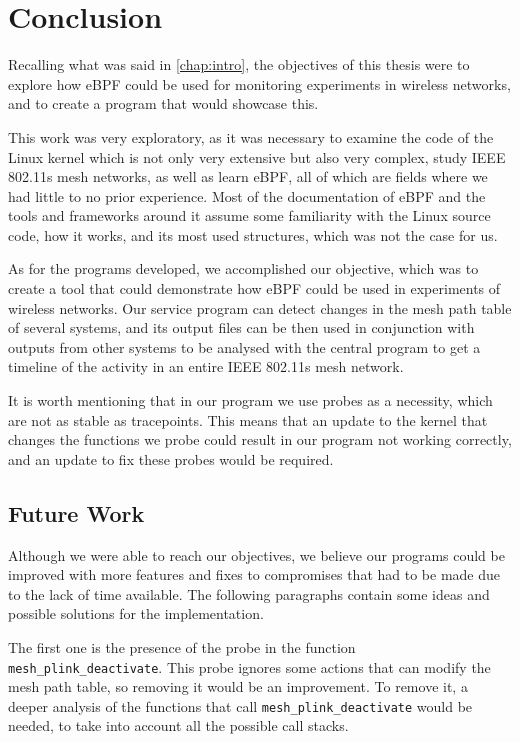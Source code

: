 \chapter{Conclusion}\label{chap:conc}

Recalling what was said in \autoref{chap:intro}, the objectives of this thesis
were to explore how eBPF could be used for monitoring experiments in wireless
networks, and to create a program that would showcase this.

This work was very exploratory, as it was necessary to examine the code of the
Linux kernel which is not only very extensive but also very complex, study
\ac{IEEE} 802.11s mesh networks, as well as learn eBPF, all of which are fields
where we had little to no prior experience. Most of the documentation of eBPF
and the tools and frameworks around it assume some familiarity with the Linux
source code, how it works, and its most used structures, which was not the case
for us.

As for the programs developed, we accomplished our objective, which was to
create a tool that could demonstrate how eBPF could be used in experiments of
wireless networks. Our service program can detect changes in the mesh path table
of several systems, and its output files can be then used in conjunction with
outputs from other systems to be analysed with the central program to get a
timeline of the activity in an entire \ac{IEEE} 802.11s mesh network.

It is worth mentioning that in our program we use probes as a necessity, which
are not as stable as tracepoints. This means that an update to the kernel that
changes the functions we probe could result in our program not working
correctly, and an update to fix these probes would be required.


\section{Future Work}

Although we were able to reach our objectives, we believe our programs could be
improved with more features and fixes to compromises that had to be made due to
the lack of time available. The following paragraphs contain some ideas and
possible solutions for the implementation.

The first one is the presence of the probe in the function
\texttt{mesh\_plink\_deactivate}. This probe ignores some actions that can
modify the mesh path table, so removing it would be an improvement. To remove
it, a deeper analysis of the functions that call
\texttt{mesh\_plink\_deactivate} would be needed, to take into account all the
possible call stacks.

